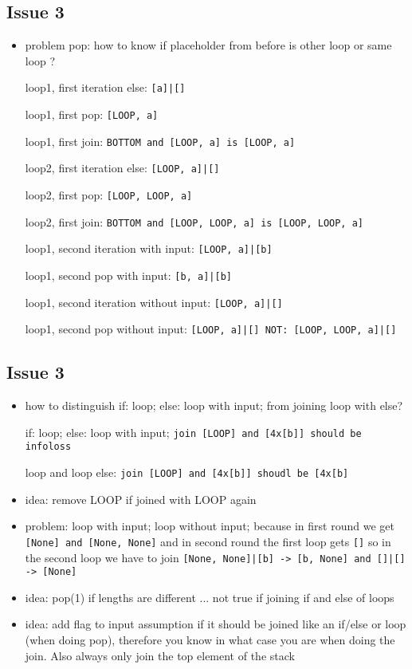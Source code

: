 \documentclass[11pt]{article}
\begin{document}
\subsection{Issue 3}

\begin{itemize}
\item problem pop: how to know if placeholder from before is other loop or same loop ?

loop1, first iteration else: \verb/[a]|[]/

loop1, first pop: \verb/[LOOP, a]/

loop1, first join: \verb/BOTTOM and [LOOP, a] is [LOOP, a]/

loop2, first iteration else: \verb/[LOOP, a]|[]/

loop2, first pop: \verb/[LOOP, LOOP, a]/

loop2, first join: \verb/BOTTOM and [LOOP, LOOP, a] is [LOOP, LOOP, a]/

loop1, second iteration with input: \verb/[LOOP, a]|[b]/

loop1, second pop with input: \verb/[b, a]|[b]/

loop1, second iteration without input: \verb/[LOOP, a]|[]/

loop1, second pop without input: \verb/[LOOP, a]|[] NOT: [LOOP, LOOP, a]|[]/

\end{itemize}

\subsection{Issue 3}
\begin{itemize}
\item how to distinguish if: loop; else: loop with input; from joining loop with else?

if: loop; else: loop with input; \verb/join [LOOP] and [4x[b]] should be infoloss/

loop and loop else: \verb/join [LOOP] and [4x[b]] shoudl be [4x[b]/

\item idea: remove LOOP if joined with LOOP again

\item problem: loop with input; loop without input; because in first round we get \verb/[None] and [None, None]/ and in second round the first loop gets \verb/[]/ so in the second loop we have to join \verb/[None, None]|[b] -> [b, None] and []|[] -> [None]/

\item idea: pop(1) if lengths are different ... not true if joining if and else of loops

\item idea: add flag to input assumption if it should be joined like an if/else or loop (when doing pop), therefore you know in what case you are when doing the join. Also always only join the top element of the stack

\end{itemize}
\end{document}
